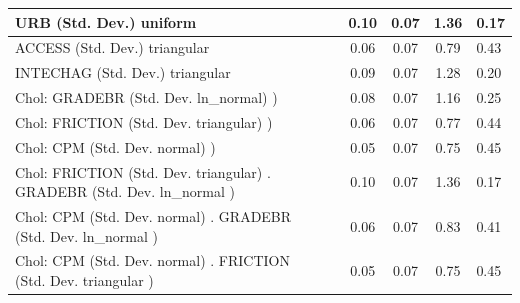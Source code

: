 \begin{table}
\begin{center}
\begin{tabular}{|l|l|c|c|c|l|}
			URB (Std. Dev.) uniform &  & 0.10 & 0.07 & 1.36 & 0.17 \\
			\hline
			ACCESS (Std. Dev.) triangular &  & 0.06 & 0.07 & 0.79 & 0.43 \\
			\hline
			INTECHAG (Std. Dev.) triangular &  & 0.09 & 0.07 & 1.28 & 0.20 \\
			\hline
			 Chol: GRADEBR (Std. Dev. ln_normal) ) &  & 0.08 & 0.07 & 1.16 & 0.25 \\
			\hline
			 Chol: FRICTION (Std. Dev. triangular) ) &  & 0.06 & 0.07 & 0.77 & 0.44 \\
			\hline
			 Chol: CPM (Std. Dev. normal) ) &  & 0.05 & 0.07 & 0.75 & 0.45 \\
			\hline
			 Chol: FRICTION (Std. Dev. triangular) . GRADEBR (Std. Dev.   ln_normal ) &  & 0.10 & 0.07 & 1.36 & 0.17 \\
			\hline
			 Chol: CPM (Std. Dev. normal) . GRADEBR (Std. Dev.   ln_normal ) &  & 0.06 & 0.07 & 0.83 & 0.41 \\
			\hline
			 Chol: CPM (Std. Dev. normal) . FRICTION (Std. Dev.   triangular ) &  & 0.05 & 0.07 & 0.75 & 0.45 \\
			\hline
		\end{tabular}
	\end{center}
\end{table}